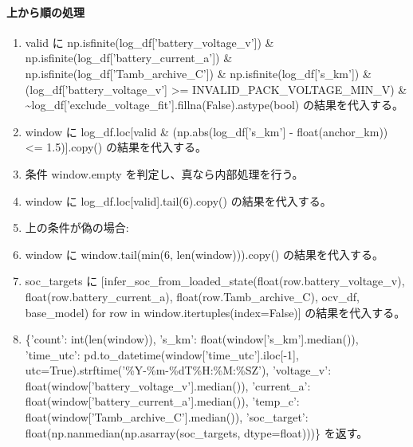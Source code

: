 \documentclass[a4paper,11pt]{article}
\begin{document}
            \paragraph{上から順の処理}
            \begin{enumerate}[leftmargin=1.8em]
            \item valid に np.isfinite(log\_df['battery\_voltage\_v']) \& np.isfinite(log\_df['battery\_current\_a']) \& np.isfinite(log\_df['Tamb\_archive\_C']) \& np.isfinite(log\_df['s\_km']) \& (log\_df['battery\_voltage\_v'] >= INVALID\_PACK\_VOLTAGE\_MIN\_V) \& \textasciitilde{}log\_df['exclude\_voltage\_fit'].fillna(False).astype(bool) の結果を代入する。
\item window に log\_df.loc[valid \& (np.abs(log\_df['s\_km'] - float(anchor\_km)) <= 1.5)].copy() の結果を代入する。
\item 条件 window.empty を判定し、真なら内部処理を行う。
\item   window に log\_df.loc[valid].tail(6).copy() の結果を代入する。
\item   上の条件が偽の場合:
\item   window に window.tail(min(6, len(window))).copy() の結果を代入する。
\item soc\_targets に [infer\_soc\_from\_loaded\_state(float(row.battery\_voltage\_v), float(row.battery\_current\_a), float(row.Tamb\_archive\_C), ocv\_df, base\_model) for row in window.itertuples(index=False)] の結果を代入する。
\item \{'count': int(len(window)), 's\_km': float(window['s\_km'].median()), 'time\_utc': pd.to\_datetime(window['time\_utc'].iloc[-1], utc=True).strftime('\%Y-\%m-\%dT\%H:\%M:\%SZ'), 'voltage\_v': float(window['battery\_voltage\_v'].median()), 'current\_a': float(window['battery\_current\_a'].median()), 'temp\_c': float(window['Tamb\_archive\_C'].median()), 'soc\_target': float(np.nanmedian(np.asarray(soc\_targets, dtype=float)))\} を返す。
            \end{enumerate}
\end{document}

